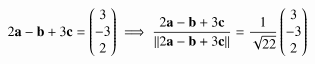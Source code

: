 \begin{align}
2\mathbf{a}-\mathbf{b}+3\mathbf{c}=\begin{pmatrix}3\\-3\\2\end{pmatrix}
\implies
\frac{2\mathbf{a}-\mathbf{b}+3\mathbf{c}}{\left\lVert2\mathbf{a}-\mathbf{b}+3\mathbf{c}\right\rVert}
=\frac{1}{\sqrt{22}}\begin{pmatrix}3\\-3\\2\end{pmatrix}
\end{align}

